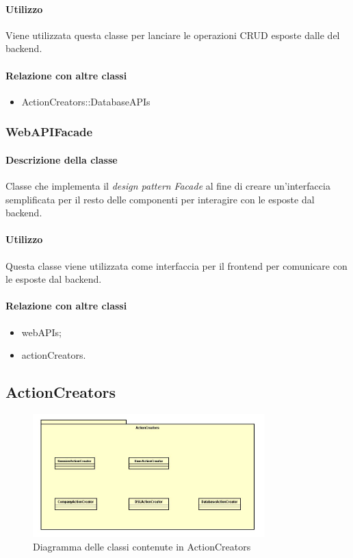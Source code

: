 \paragraph*{Utilizzo}
Viene utilizzata questa classe per lanciare le operazioni CRUD esposte dalle  del backend.

\paragraph*{Relazione con altre classi}
\begin{itemize}
\item ActionCreators::DatabaseAPIs
\end{itemize}

\subsubsection{WebAPIFacade}
\paragraph*{Descrizione della classe}
Classe che implementa il \textit{design pattern} \textit{Facade} al fine di creare un'interfaccia semplificata per il resto delle componenti per interagire con le  esposte dal backend.
\paragraph*{Utilizzo}
Questa classe viene utilizzata come interfaccia per il frontend per comunicare con le  esposte dal backend.
\paragraph*{Relazione con altre classi}
\begin{itemize}
\item webAPIs;
\item actionCreators.
\end{itemize} 

\subsection{ActionCreators}

\begin{figure}[h]
\centering
\includegraphics[width=0.8\textwidth]{res/sections/imgs/actioncreator-diagram.jpg}
\caption{Diagramma delle classi contenute in ActionCreators}
\end{figure}

